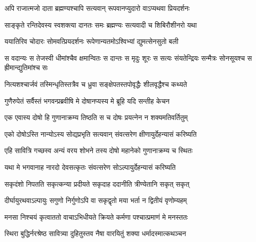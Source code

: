 \twolineshloka
{अपि राजात्मजो दाता ब्रह्मण्यश्चापि सत्यवान्}
{रूपवानप्युदारो वाऽप्यथवा प्रियदर्शनः}




\twolineshloka
{साङ्कृते रन्तिदेवस्य स्वशक्त्या दानतः समः}
{ब्रह्मण्यः सत्यवादी च शिबिरौशीनरो यथा}


\twolineshloka
{ययातिरिव चोदारः सोमवत्प्रियदर्शनः}
{रूपेणान्यतमोऽश्विभ्यां द्युमत्सेनसुतो बली}


\threelineshloka
{स वदान्यः स तेजस्वी धीमांश्चैव क्षमान्वितः}
{स दान्तः स मृदुः शूरः स सत्यः संयतेन्द्रियः}
{सन्मैत्रः सोनसूयश्च स ह्रीमान्द्युतिमांश्च सः}


\twolineshloka
{नित्यशश्चार्जवं तस्मिन्धृतिस्तत्रैव च ध्रुवा}
{सङ्क्षेपतस्तपोवृद्धैः शीलवृद्धैश्च कथ्यते}




\twolineshloka
{गुणैरुपेतं सर्वैस्तं भगवन्प्रब्रवीषि मे}
{दोषानप्यस्य मे ब्रूहि यदि सन्तीह केचन}




\twolineshloka
{एक एवास्य दोषो हि गुणानाक्रम्य तिष्ठति}
{स च दोषः प्रयत्नेन न शक्यमतिवर्तितुम्}


\twolineshloka
{एको दोषोऽस्ति नान्योऽस्य सोद्यप्रभृति सत्यवान्}
{संवत्सरेण क्षीणायुर्देहन्यासं करिष्यति}




\twolineshloka
{एहि सावित्रि गच्छस्व अन्यं वरय शोभने}
{तस्य दोषो महानेको गुणानाक्रम्य च स्थितः}


\twolineshloka
{यथा मे भगवानाह नारदो देवसत्कृतः}
{संवत्सरेण सोऽल्पायुर्देहन्यासं करिष्यति}




\twolineshloka
{सकृदंशो निपतति सकृत्कन्या प्रदीयते}
{सकृदाह ददानीति त्रीण्येतानि सकृत् सकृत्}


\twolineshloka
{दीर्घायुरथवाऽल्पायुः सगुणो निर्गुणोऽपि वा}
{सकृद्वृतो मया भर्ता न द्वितीयं वृणोम्यहम्}


\twolineshloka
{मनसा निश्चयं कृत्वाततो वाचाऽभिधीयते}
{क्रियते कर्मणा पश्चात्प्रमाणं मे मनस्ततः}




\twolineshloka
{स्थिरा बुद्धिर्नरश्रेष्ठ सावित्र्या दुहितुस्तव}
{नैषा वारयितुं शक्या धर्मादस्मात्कथञ्चन}


